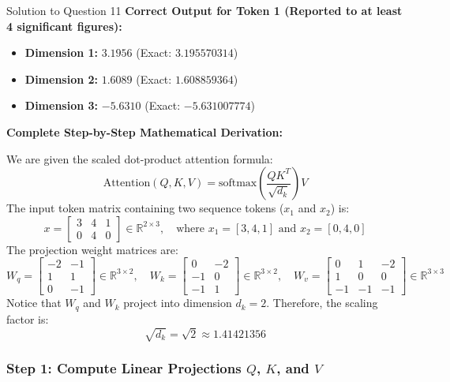 \documentclass[11pt,a4paper]{article}
\begin{document}
\begin{solutionbox}{Solution to Question 11}
\textbf{Correct Output for Token 1 (Reported to at least 4 significant figures):}
\begin{itemize}
    \item \textbf{Dimension 1:} $\mathbf{3.1956}$ \quad (Exact: $3.195570314$)
    \item \textbf{Dimension 2:} $\mathbf{1.6089}$ \quad (Exact: $1.608859364$)
    \item \textbf{Dimension 3:} $\mathbf{-5.6310}$ \quad (Exact: $-5.631007774$)
\end{itemize}

\medskip
\textbf{Complete Step-by-Step Mathematical Derivation:}

We are given the scaled dot-product attention formula:
\[
\text{Attention}(Q, K, V) = \text{softmax}\left(\frac{Q K^T}{\sqrt{d_k}}\right) V
\]
The input token matrix containing two sequence tokens ($x_1$ and $x_2$) is:
\[
x = \begin{bmatrix}
3 & 4 & 1 \\
0 & 4 & 0
\end{bmatrix} \in \mathbb{R}^{2 \times 3}, \quad \text{where } x_1 = [3, 4, 1] \text{ and } x_2 = [0, 4, 0]
\]
The projection weight matrices are:
\[
W_q = \begin{bmatrix}
-2 & -1 \\
1 & 1 \\
0 & -1
\end{bmatrix} \in \mathbb{R}^{3 \times 2}, \quad
W_k = \begin{bmatrix}
0 & -2 \\
-1 & 0 \\
-1 & 1
\end{bmatrix} \in \mathbb{R}^{3 \times 2}, \quad
W_v = \begin{bmatrix}
0 & 1 & -2 \\
1 & 0 & 0 \\
-1 & -1 & -1
\end{bmatrix} \in \mathbb{R}^{3 \times 3}
\]
Notice that $W_q$ and $W_k$ project into dimension $d_k = 2$. Therefore, the scaling factor is:
\[
\sqrt{d_k} = \sqrt{2} \approx 1.41421356
\]

\subsubsection*{Step 1: Compute Linear Projections $Q$, $K$, and $V$}


\end{solutionbox}
\end{document}
